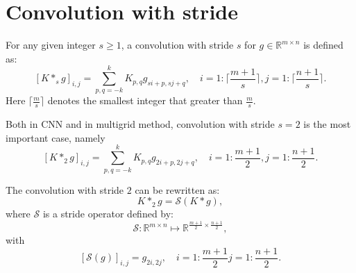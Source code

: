 \section{Convolution with stride}
\begin{definition}
For any given integer $s\ge1$, a convolution with stride $s$ for $g \in \mathbb{R}^{m\times n}$ is defined as:
	\begin{equation}\label{stride}
	[K \ast_s g]_{i,j} = \sum_{p,q=-k}^k K_{p,q} g_{si + p, sj + q},  
	\quad i = 1: \lceil  \frac{m+1}{s}\rceil, j = 1: \lceil  \frac{n+1}{s}\rceil.
	\end{equation}
	Here $ \lceil  \frac{m}{s}\rceil$ denotes the smallest integer that greater than $\frac{m}{s}$.
\end{definition}
Both in CNN and in multigrid method, convolution with stride $s=2$ is the most important case, namely
\begin{equation}\label{stride_2}
[K \ast_2 g]_{i,j} = \sum_{p,q=-k}^k K_{p,q} g_{2i + p, 2j + q},  
\quad i = 1: \frac{m+1}{2} , j = 1: \frac{n+1}{2}.
\end{equation}


\begin{lemma}
The convolution with stride $2$ can be rewritten as:
\begin{equation}\label{eq:convstride_2_1}
K \ast_2 g = \mathcal S( K\ast g),
\end{equation}
where $\mathcal S$ is a stride operator defined by:
\begin{equation}\label{eq:strideopdim}
\mathcal S: \mathbb{R}^{m \times n} \mapsto \mathbb{R}^{\frac{m+1}{2} \times \frac{n+1}{2}},
\end{equation}
with
\begin{equation}\label{eq:strideop}
[\mathcal S(g)]_{i,j} = g_{2i, 2j}, \quad i  = 1: \frac{m+1}{2} j = 1: \frac{n+1}{2}.
\end{equation}
\end{lemma}
